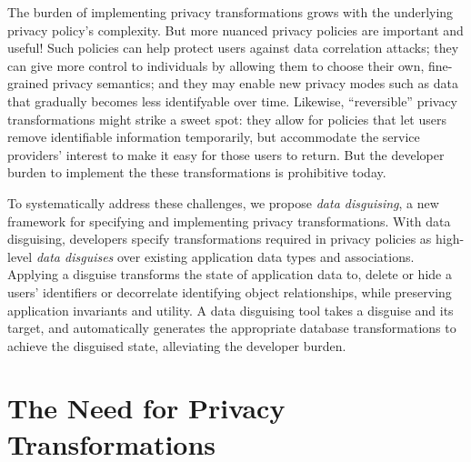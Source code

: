 %
The burden of implementing privacy transformations grows with the underlying privacy policy's
complexity.
%
But more nuanced privacy policies are important and useful!
%
Such policies can help protect users against data correlation attacks; they can give more
control to individuals by allowing them to choose their own, fine-grained privacy semantics; and
they may enable new privacy modes such as data that gradually becomes less identifyable over
time.
%
Likewise, ``reversible'' privacy transformations might strike a sweet spot: they allow for
policies that let users remove identifiable information temporarily, but accommodate the service
providers' interest to make it easy for those users to return.
%
But the developer burden to implement the these transformations is prohibitive today.
%


%
To systematically address these challenges, we propose \emph{data disguising}, a new framework
for specifying and implementing privacy transformations.
%
With data disguising, developers specify transformations required in privacy policies as
high-level \emph{data disguises} over existing application data types and associations.
%
Applying a disguise transforms the state of application data to, \eg delete or hide a users'
identifiers or decorrelate identifying object relationships, while preserving application
invariants and utility.
%
%
A data disguising tool takes a disguise and its target, and automatically generates the
appropriate database transformations to achieve the disguised state, alleviating the developer
burden.
%


\section{The Need for Privacy Transformations}
\label{sec:survey}

